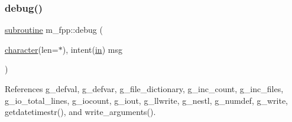\subsubsection{\texorpdfstring{debug()}{debug()}}
{\footnotesize\ttfamily \hyperlink{M__stopwatch_83_8txt_acfbcff50169d691ff02d4a123ed70482}{subroutine} m\+\_\+fpp\+::debug (\begin{DoxyParamCaption}\item[{\hyperlink{option__stopwatch_83_8txt_abd4b21fbbd175834027b5224bfe97e66}{character}(len=$\ast$), intent(\hyperlink{M__journal_83_8txt_afce72651d1eed785a2132bee863b2f38}{in})}]{msg }\end{DoxyParamCaption})}



References g\+\_\+defval, g\+\_\+defvar, g\+\_\+file\+\_\+dictionary, g\+\_\+inc\+\_\+count, g\+\_\+inc\+\_\+files, g\+\_\+io\+\_\+total\+\_\+lines, g\+\_\+iocount, g\+\_\+iout, g\+\_\+llwrite, g\+\_\+nestl, g\+\_\+numdef, g\+\_\+write, getdatetimestr(), and write\+\_\+arguments().

